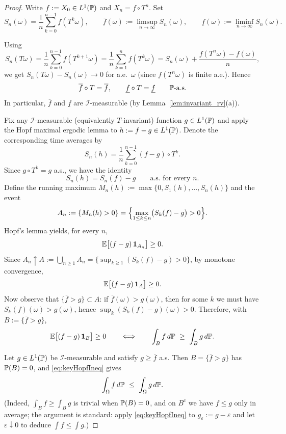 \begin{proof}
Write $f:=X_0\in L^1(\mathbb{P})$ and $X_n=f\circ T^n$.  Set
\[
S_n(\omega)=\frac1n\sum_{k=0}^{n-1} f(T^k\omega),\qquad
\overline f(\omega):=\limsup_{n\to\infty} S_n(\omega),\qquad
\underline f(\omega):=\liminf_{n\to\infty} S_n(\omega).
\]

\medskip
{}
Using
\[
S_n(T\omega)
=\frac1n\sum_{k=0}^{n-1} f(T^{k+1}\omega)
=\frac1n\sum_{k=1}^{n} f(T^{k}\omega)
=S_n(\omega)+\frac{f(T^n\omega)-f(\omega)}{n},
\]
we get $S_n(T\omega)-S_n(\omega)\to 0$ for a.e.\ $\omega$ (since $f(T^n\omega)$ is finite a.e.).
Hence
\[
\overline f\circ T=\overline f,\qquad \underline f\circ T=\underline f \qquad \mathbb{P}\text{-a.s.}
\]
In particular, $\overline f$ and $\underline f$ are $\mathcal I$-measurable (by Lemma~\ref{lem:invariant_rv}(a)).

\medskip
{}
Fix any $\mathcal I$-measurable (equivalently $T$-invariant) function $g\in L^1(\mathbb{P})$ and apply the
Hopf maximal ergodic lemma to $h:=f-g\in L^1(\mathbb{P})$.
Denote the corresponding time averages by
\[
S_n(h)=\frac1n\sum_{k=0}^{n-1} (f-g)\circ T^k.
\]
Since $g\circ T^k=g$ a.s., we have the identity
\[
S_n(h)=S_n(f)-g\qquad\text{a.s. for every }n.
\]
Define the running maximum $M_n(h):=\max\{0,S_1(h),\dots,S_n(h)\}$ and the event
\[
A_n:=\{M_n(h)>0\}=\Bigl\{\max_{1\le k\le n}\bigl(S_k(f)-g\bigr)>0\Bigr\}.
\]
Hopf's lemma yields, for every $n$,
\[
\mathbb{E}\bigl[(f-g)\,\mathbf 1_{A_n}\bigr]\ge 0.
\]
Since $A_n\uparrow A:=\bigcup_{n\ge 1}A_n=\{\sup_{k\ge 1}(S_k(f)-g)>0\}$, by monotone convergence,
\[
\mathbb{E}\bigl[(f-g)\,\mathbf 1_{A}\bigr]\ge 0.
\]
Now observe that $\{\overline f>g\}\subset A$: if $\overline f(\omega)>g(\omega)$, then for some $k$ we must have
$S_k(f)(\omega)>g(\omega)$, hence $\sup_k(S_k(f)-g)(\omega)>0$.
Therefore, with $B:=\{\overline f>g\}$,
\begin{equation}\label{eq:keyHopfIneq}
\mathbb{E}\bigl[(f-g)\,\mathbf 1_{B}\bigr]\ge 0
\qquad\Longleftrightarrow\qquad
\int_{B} f\,d\mathbb{P} \ \ge\ \int_{B} g\,d\mathbb{P}.
\end{equation}

\medskip
{}
Let $g\in L^1(\mathbb{P})$ be $\mathcal I$-measurable and satisfy $g\ge \overline f$ a.s.
Then $B=\{\overline f>g\}$ has $\mathbb{P}(B)=0$, and \eqref{eq:keyHopfIneq} gives
\[
\int_\Omega f\,d\mathbb{P} \ \le\ \int_\Omega g\,d\mathbb{P}.
\]
(Indeed, $\int_B f\ge \int_B g$ is trivial when $\mathbb{P}(B)=0$, and on $B^c$ we have $f\le g$ only in average; the
argument is standard: apply \eqref{eq:keyHopfIneq} to $g_\varepsilon:=g-\varepsilon$ and let $\varepsilon\downarrow 0$
to deduce $\int f\le \int g$.)


\end{proof}
